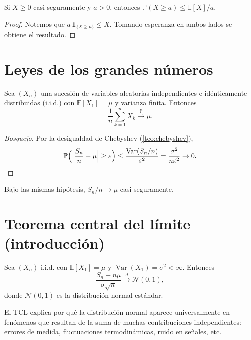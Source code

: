 \begin{corollary}
\label{cor:markov}
Si $X\geq 0$ casi seguramente y $a>0$, entonces $\mathbb{P}(X\geq a)\leq\mathbb{E}[X]/a$.
\end{corollary}
\begin{proof}
Notemos que $a\,\mathbf{1}_{\{X\geq a\}}\leq X$. Tomando esperanza en ambos lados se obtiene el resultado.
\end{proof}

\section{Leyes de los grandes números}

\begin{theorem}
\label{teo:ley-debil}
Sea $(X_n)$ una sucesión de variables aleatorias independientes e idénticamente distribuidas (i.i.d.) con $\mathbb{E}[X_1]=\mu$ y varianza finita. Entonces
\[
  \frac{1}{n}\sum_{k=1}^{n}X_k\xrightarrow{\mathbb{P}}\mu.
\]
\end{theorem}
\begin{proof}[Bosquejo]
Por la desigualdad de Chebyshev (\cref{teo:chebyshev}),
\[
  \mathbb{P}\Bigl(\Bigl|\frac{S_n}{n}-\mu\Bigr|\geq\varepsilon\Bigr)\leq\frac{\operatorname{Var}(S_n/n)}{\varepsilon^2}=\frac{\sigma^2}{n\varepsilon^2}\to 0.
\]
\end{proof}

\begin{theorem}
\label{teo:ley-fuerte}
Bajo las mismas hipótesis, $S_n/n\to\mu$ casi seguramente.
\end{theorem}

\section{Teorema central del límite (introducción)}

\begin{theorem}
\label{teo:tcl}
Sea $(X_n)$ i.i.d. con $\mathbb{E}[X_1]=\mu$ y $\operatorname{Var}(X_1)=\sigma^2<\infty$. Entonces
\[
  \frac{S_n-n\mu}{\sigma\sqrt{n}}\xrightarrow{d}\mathcal{N}(0,1),
\]
donde $\mathcal{N}(0,1)$ es la distribución normal estándar.
\end{theorem}

\begin{remark}
El TCL explica por qué la distribución normal aparece universalmente en fenómenos que resultan de la suma de muchas contribuciones independientes: errores de medida, fluctuaciones termodinámicas, ruido en señales, etc.
\end{remark}

